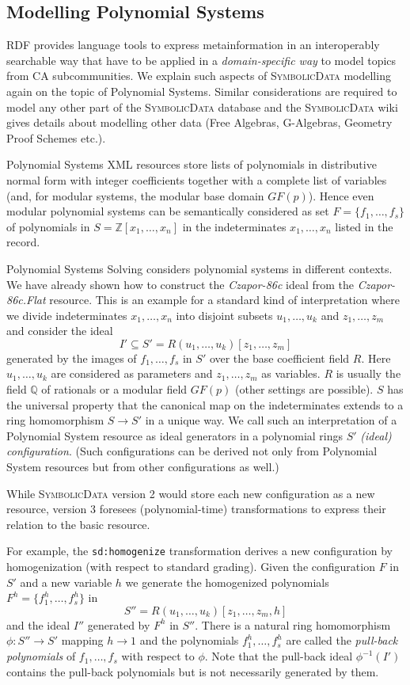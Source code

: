 \documentclass[a4paper,11pt]{article}
\def\Ueberschrift#1#2{\section{#1}}
\def\SD{\textsc{SymbolicData}}
\begin{document}
\begin{multicols}{2}
\Ueberschrift{Modelling Polynomial Systems}{MPS}

RDF provides language tools to express metainformation in an interoperably
searchable way that have to be applied in a \emph{domain-specific way} to model
topics from CA subcommunities.  We explain such aspects of {\SD} modelling
again on the topic of Polynomial Systems.  Similar considerations are required
to model any other part of the {\SD} database and the {\SD} wiki \cite{sdwiki}
gives details about modelling other data (Free Algebras, G-Algebras, Geometry
Proof Schemes etc.).

Polynomial Systems XML resources store lists of polynomials in 
distributive normal form with integer coefficients together with a 
complete list of variables (and, for modular systems, the modular base 
domain $GF(p)$).  Hence even modular polynomial systems can be 
semantically considered as set $F = \{f_1,\dots,f_s\}$ of polynomials in 
$S = \mathbb{Z}[x_1,\dots,x_n]$ in the indeterminates $x_1,\dots,x_n$ 
listed in the record.

Polynomial Systems Solving considers polynomial systems in different 
contexts.  We have already shown how to construct the \emph{Czapor-86c} 
ideal from the \emph{Czapor-86c.Flat} resource.  This is an example 
for a standard kind of interpretation where we divide indeterminates 
$x_1,\dots,x_n$ into disjoint subsets $u_1,\dots,u_k$ and $z_1,\dots,z_m$ 
and consider the ideal
$$
I'\subseteq S'=R(u_1,\dots,u_k)[z_1,\dots,z_m]
$$
generated by the images of $f_1,\dots,f_s$ in $S'$ over the base 
coefficient field $R$.  Here $u_1,\dots,u_k$ are considered as 
parameters and $z_1,\dots,z_m$ as variables.  $R$ is usually the field 
$\mathbb{Q}$ of rationals or a modular field $GF(p)$ (other settings are 
possible).  $S$ has the universal property that the canonical map on the 
indeterminates extends to a ring homomorphism $S\to S'$ in a unique way.  
We call such an interpretation of a Polynomial System resource as ideal 
generators in a polynomial rings $S'$ \emph{(ideal) configuration}.  
(Such configurations can be derived not only from Polynomial System 
resources but from other configurations as well.)

While {\SD} version 2 would store each new configuration as a new 
resource, version 3 foresees (polynomial-time) transformations to express 
their relation to the basic resource.

For example, the \texttt{sd:homogenize} transformation derives a new
configuration by homogenization (with respect to standard grading).  Given the
configuration $F$ in $S'$ and a new variable $h$ we generate the homogenized
polynomials $F^h = \{f_1^h,\dots,f_s^h\}$ in
$$
S'' = R(u_1,\dots,u_k)[z_1,\dots,z_m,h]
$$
and the ideal $I''$ generated by $F^h$ in $S''$.  There is a natural 
ring homomorphism $\phi:S''\to S'$ mapping $h\to 1$ and the polynomials 
$f_1^h,\dots,f_s^h$ are called the \emph{pull-back polynomials} of 
$f_1,\dots,f_s$ with respect to $\phi$.  Note that the pull-back ideal 
$\phi^{-1}(I')$ contains the pull-back polynomials but is not 
necessarily generated by them.


\end{multicols}
\end{document}
